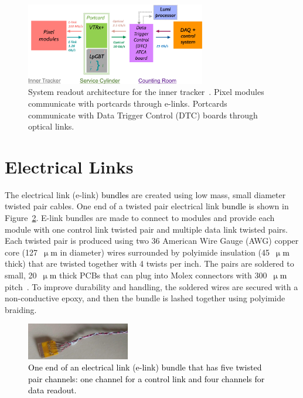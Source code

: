 \documentclass[a4paper,11pt]{article}
\newcommand{\fig}{Figure}
\newcommand{\micron}{\ensuremath{\upmu\mathrm{m}}\xspace}
\newcommand{\black}{\textcolor{black}}
\begin{document}
\begin{figure}[htbp]
\centering
\includegraphics[width=0.70\textwidth,origin=c]{../figures/IT_System_Readout_3-crop.pdf}
\caption{
\label{fig:readout}
System readout architecture for the inner tracker~\cite{ref:orfanelli}. Pixel modules communicate with portcards through e-links. Portcards communicate with Data Trigger Control (DTC) boards through optical links.
}
\end{figure}

\section{Electrical Links}
\label{sec:electrical}


The electrical link (e-link) \black{bundles} are created using low mass, small diameter twisted pair cables.
One end of a twisted pair electrical link \black{bundle} is shown in \fig~\ref{fig:elink}.
E-link bundles are made to connect to modules and provide each module with one control link twisted pair and multiple data link twisted pairs.
Each twisted pair is produced using two 36 American Wire Gauge (AWG) copper core (127~\black{\micron} in diameter) wires surrounded by polyimide insulation (45~\black{\micron} thick) that are twisted together with 4 twists per inch.
The pairs are soldered to small, 20~\black{\micron} thick PCBs that can plug into Molex connectors with 300~\black{\micron} pitch~\cite{ref:molex45}.
To improve durability and handling, the soldered wires are secured with a non-conductive epoxy, and then the bundle is lashed together using polyimide braiding.

\begin{figure}[htbp]
\centering
\includegraphics[width=0.4\textwidth,origin=c]{../figures/e-link-1.jpg}
\caption{
\label{fig:elink}
\black{One end of an electrical link (e-link) bundle that has five twisted pair channels: one channel for a control link and four channels for data readout.}
}
\end{figure}
\end{document}
